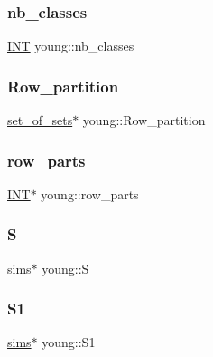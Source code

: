 \subsubsection{\texorpdfstring{nb\+\_\+classes}{nb\_classes}}
{\footnotesize\ttfamily \mbox{\hyperlink{galois_8h_a09fddde158a3a20bd2dcadb609de11dc}{I\+NT}} young\+::nb\+\_\+classes}

\mbox{\label{classyoung_ac624b1fad588941f5cf8c2abeafa30fc}} 
\subsubsection{\texorpdfstring{Row\+\_\+partition}{Row\_partition}}
{\footnotesize\ttfamily \mbox{\hyperlink{classset__of__sets}{set\+\_\+of\+\_\+sets}}$\ast$ young\+::\+Row\+\_\+partition}

\mbox{\label{classyoung_a70a3bc5bc0374ff9e350d8a3874d6df7}} 
\subsubsection{\texorpdfstring{row\+\_\+parts}{row\_parts}}
{\footnotesize\ttfamily \mbox{\hyperlink{galois_8h_a09fddde158a3a20bd2dcadb609de11dc}{I\+NT}}$\ast$ young\+::row\+\_\+parts}

\mbox{\label{classyoung_a275b7085ff8ff4243091d5fdfcd24c27}} 
\subsubsection{\texorpdfstring{S}{S}}
{\footnotesize\ttfamily \mbox{\hyperlink{classsims}{sims}}$\ast$ young\+::S}

\mbox{\label{classyoung_a5afcd66990568aebac39bcffc559dc67}} 
\subsubsection{\texorpdfstring{S1}{S1}}
{\footnotesize\ttfamily \mbox{\hyperlink{classsims}{sims}}$\ast$ young\+::\+S1}


